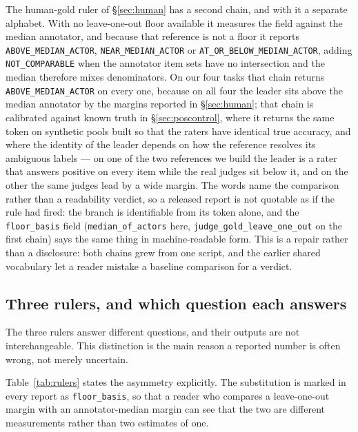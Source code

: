 \documentclass{article}
\begin{document}
{\sloppy The human-gold ruler of \S\ref{sec:human} has a second chain, and with it a separate alphabet. With no
leave-one-out floor available it measures the field against the median annotator, and because that reference is not a
floor it reports \texttt{ABOVE\_MEDIAN\_ACTOR}, \texttt{NEAR\_MEDIAN\_ACTOR} or
\texttt{AT\_OR\_BELOW\_MEDIAN\_ACTOR}, adding \texttt{NOT\_COMPARABLE} when the annotator item sets have no
intersection and the median therefore mixes denominators. On our four tasks that chain returns
\texttt{ABOVE\_MEDIAN\_ACTOR} on every one, because on all four the leader sits above the median annotator by the
margins reported in \S\ref{sec:human}; that chain is calibrated against known truth in \S\ref{sec:poscontrol}, where it
returns the same token on synthetic pools built so that the raters have identical true accuracy, and where the identity of
the leader depends on how the reference resolves its ambiguous labels --- on one of the two references we build the leader
is a rater that answers positive on every item while the real judges sit below it, and on the other the same judges lead by
a wide margin. The words name the comparison rather than a readability verdict, so a released report is not quotable as if the rule had fired: the branch is identifiable from its token alone, and the
\texttt{floor\_basis} field (\texttt{median\_of\_actors} here, \texttt{judge\_gold\_leave\_one\_out} on the first
chain) says the same thing in machine-readable form. This is a repair rather than a disclosure: both chains grew from
one script, and the earlier shared vocabulary let a reader mistake a baseline comparison for a verdict.\par}
\subsection{Three rulers, and which question each answers}
\label{sec:three} The three rulers answer different questions, and their outputs are not interchangeable. This distinction is the main reason a reported number is often wrong, not merely uncertain.
\begin{table}[htbp] \centering \small

\caption{The three rulers. The second row is the important one: under human gold the leave-one-out construction has no referent, because no model contributed to the labels. We return \texttt{NULL} for the floor and state the reason instead of substituting a number.}
\label{tab:rulers}
\end{table} Table~\ref{tab:rulers} states the asymmetry explicitly. The substitution is marked in every report as \texttt{floor\_basis}, so that a reader who compares a leave-one-out margin with an annotator-median margin can see that the two are different measurements rather than two estimates of one.
\end{document}
